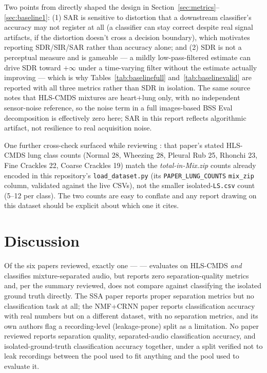 \documentclass[11pt]{article}
\begin{document}
Two points from \cite{vincent2006} directly shaped the design in
Section~\ref{sec:metrics}--\ref{sec:baseline1}: (1) SAR is sensitive to
distortion that a downstream classifier's accuracy may not register at all
(a classifier can stay correct despite real signal artifacts, if the
distortion doesn't cross a decision boundary), which motivates reporting
SDR/SIR/SAR rather than accuracy alone; and (2) SDR is not a perceptual
measure and is gameable --- a mildly low-pass-filtered estimate can drive
SDR toward $+\infty$ under a time-varying filter without the estimate
actually improving --- which is why Tables~\ref{tab:baselinefull}
and~\ref{tab:baselinevalid} are reported with all three metrics rather than
SDR in isolation. The same source notes
that HLS-CMDS mixtures are heart+lung only, with no independent
sensor-noise reference, so the noise term in a full images-based BSS Eval
decomposition is effectively zero here; SAR in this report reflects
algorithmic artifact, not resilience to real acquisition noise.

One further cross-check surfaced while reviewing \cite{edgelung}: that
paper's stated HLS-CMDS lung class counts (Normal 28, Wheezing 28, Pleural
Rub 25, Rhonchi 23, Fine Crackles 22, Coarse Crackles 19) match the
\emph{total-in-Mix.zip} counts already encoded in this repository's
\texttt{load\_dataset.py} (its \texttt{PAPER\_LUNG\_COUNTS}
\texttt{mix\_zip} column, validated against the live CSVs), not the smaller
isolated-\texttt{LS.csv} count (5--12 per class). The two counts are easy to
conflate and any report drawing on this dataset should be explicit about
which one it cites.

\section{Discussion}
\label{sec:discussion}

Of the six papers reviewed, exactly one --- \cite{edgelung} --- evaluates
on HLS-CMDS \emph{and} classifies mixture-separated audio, but reports zero
separation-quality metrics and, per the summary reviewed, does not compare
against classifying the isolated ground truth directly. The SSA paper
\cite{ssa} reports proper separation metrics but no classification task at
all; the NMF+CRNN paper \cite{nmfcrnn} reports classification accuracy with
real numbers but on a different dataset, with no separation metrics, and its
own authors flag a recording-level (leakage-prone) split as a limitation.
No paper reviewed reports separation quality, separated-audio classification
accuracy, and isolated-ground-truth classification accuracy together, under
a split verified not to leak recordings between the pool used to fit
anything and the pool used to evaluate it.
\end{document}
